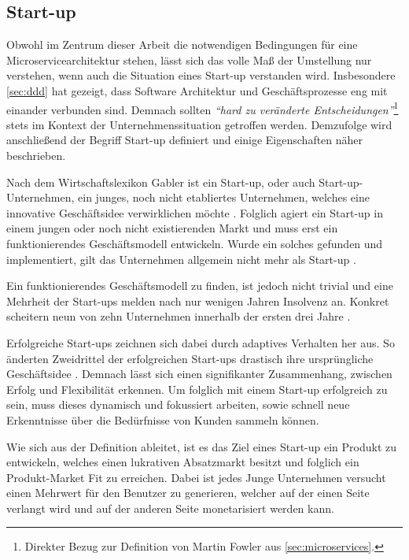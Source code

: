 \subsection{Start-up}
Obwohl im Zentrum dieser Arbeit die notwendigen Bedingungen für eine Microservicearchitektur stehen, lässt sich das volle Maß der Umstellung nur verstehen, wenn auch die Situation eines Start-up verstanden wird. Insbesondere \cref{sec:ddd} hat gezeigt, dass Software Architektur und Geschäftsprozesse eng mit einander verbunden sind. Demnach sollten \textit{\enquote{hard zu veränderte Entscheidungen}}\footnote{Direkter Bezug zur Definition von Martin Fowler aus \cref{sec:microservices}.} stets im Kontext der Unternehmenssituation getroffen werden. Demzufolge wird anschließend der Begriff Start-up definiert und einige Eigenschaften näher beschrieben.

Nach dem Wirtschaftslexikon Gabler ist ein Start-up, oder auch Start-up-Unternehmen, ein junges, noch nicht etabliertes Unternehmen, welches eine innovative Geschäftsidee verwirklichen möchte \parencite[vgl.][]{achleitner_start-up_2018}. Folglich agiert ein Start-up in einem jungen oder noch nicht existierenden Markt und muss erst ein funktionierendes Geschäftsmodell entwickeln. Wurde ein solches gefunden und implementiert, gilt das Unternehmen allgemein nicht mehr als Start-up \parencite[vgl.][]{wiki_start-up-unternehmen_2020}.

Ein funktionierendes Geschäftsmodell zu finden, ist jedoch nicht trivial und eine Mehrheit der Start-ups melden nach nur wenigen Jahren Insolvenz an. Konkret scheitern neun von zehn Unternehmen innerhalb der ersten drei Jahre \parencite[vgl.][]{patel_startups-fail_2015}.

Erfolgreiche Start-ups zeichnen sich dabei durch adaptives Verhalten her aus. So änderten Zweidrittel der erfolgreichen Start-ups drastisch ihre ursprüngliche Geschäftsidee \parencite{mullins_getting_2009}. Demnach lässt sich einen signifikanter Zusammenhang, zwischen Erfolg und Flexibilität erkennen. Um folglich mit einem Start-up erfolgreich zu sein, muss dieses dynamisch und fokussiert arbeiten, sowie schnell neue Erkenntnisse über die Bedürfnisse von Kunden sammeln können.

Wie sich aus der Definition ableitet, ist es das Ziel eines Start-up ein Produkt zu entwickeln, welches einen lukrativen Absatzmarkt besitzt und folglich ein Produkt-Market Fit zu erreichen. Dabei ist jedes Junge Unternehmen versucht einen Mehrwert für den Benutzer zu generieren, welcher auf der einen Seite verlangt wird und auf der anderen Seite monetarisiert werden kann.

